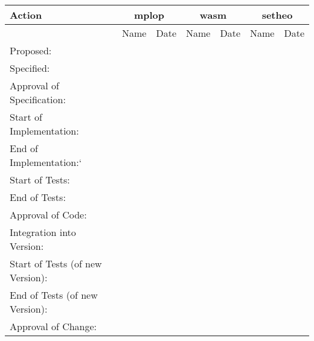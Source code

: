 \begin{center}
\begin{tabular}{|l||c|c||c|c||c|c||}
\hline\hline
Action & \multicolumn{2}{|c|}{mplop} &
\multicolumn{2}{|c|}{wasm} & \multicolumn{2}{|c|}{setheo}  \\
\hline
& Name & Date & Name & Date & Name & Date \\
\hline\hline
 Proposed:& & & & & & \\
 Specified:& & & & & & \\
 Approval of Specification:& & & & & & \\
 Start of Implementation:& & & & & & \\
 End of Implementation:`& & & & & & \\
 Start of Tests:& & & & & & \\
 End of Tests:& & & & & & \\
 Approval of Code:& & & & & & \\
 Integration into Version: & & & & & & \\
 Start of Tests (of new Version):& & & & & & \\
 End of Tests (of new Version):& & & & & & \\
 Approval of Change:& & & & & & \\
\hline\hline
\end{tabular}
\end{center}


